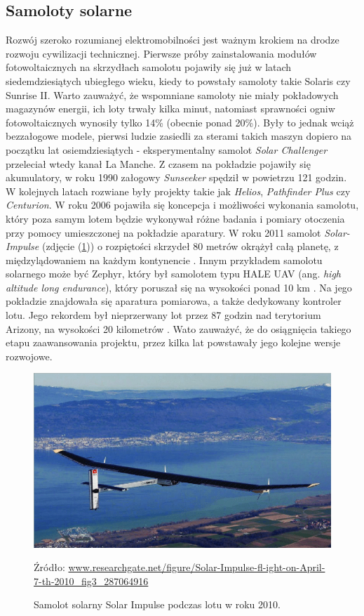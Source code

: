 \documentclass[12pt, a4paper]{article}
\let\oldref\ref
\renewcommand{\ref}[1]{(\oldref{#1})}
\begin{document}
\subsection{Samoloty solarne}
Rozwój szeroko rozumianej elektromobilności jest ważnym krokiem na drodze rozwoju cywilizacji technicznej. Pierwsze próby zainstalowania modułów fotowoltaicznych na skrzydłach samolotu pojawiły się już w latach siedemdziesiątych ubiegłego wieku, kiedy to powstały samoloty takie Solaris czy Sunrise II. Warto zauważyć, że wspomniane samoloty nie miały pokładowych magazynów energii, ich loty trwały kilka minut, natomiast sprawności ogniw fotowoltaicznych wynosiły tylko 14\% (obecnie ponad 20\%). Były to jednak wciąż bezzałogowe modele, pierwsi ludzie zasiedli za sterami takich maszyn dopiero na początku lat osiemdziesiątych - eksperymentalny samolot \textit{Solar Challenger} przeleciał wtedy kanał La Manche. Z czasem na pokładzie pojawiły się akumulatory, w roku 1990 załogowy \textit{Sunseeker} spędził w powietrzu 121 godzin. W kolejnych latach rozwiane były projekty takie jak \textit{Helios}, \textit{Pathfinder Plus} czy \textit{Centurion}. W roku 2006 pojawiła się koncepcja i możliwości wykonania samolotu, który poza samym lotem będzie wykonywał różne badania i pomiary otoczenia przy pomocy umieszczonej na pokładzie aparatury. W roku 2011 samolot \textit{Solar-Impulse} (zdjęcie \ref{fig:solimp}) o rozpiętości skrzydeł 80 metrów okrążył całą planetę, z międzylądowaniem na każdym kontynencie \cite{Design of Solar Powered Airplane}. Innym przykładem samolotu solarnego może być Zephyr, który był samolotem typu HALE UAV (ang. \textit{high altitude long endurance}), który poruszał się na wysokości ponad 10 km . Na jego pokładzie znajdowała się aparatura pomiarowa, a także dedykowany kontroler lotu. Jego rekordem był nieprzerwany lot przez 87 godzin nad terytorium Arizony, na wysokości 20 kilometrów \cite{zephyr}. Wato zauważyć, że do osiągnięcia takiego etapu zaawansowania projektu, przez kilka lat powstawały jego kolejne wersje rozwojowe.

\begin{figure}[ht]
    \centering
    \includegraphics[width=1\textwidth]{solarimpulse}
    \caption{Samolot solarny Solar Impulse podczas lotu w roku 2010.}
    \small Źródło: \url{www.researchgate.net/figure/Solar-Impulse-fl-ight-on-April-7-th-2010_fig3_287064916}
    \label{fig:solimp}
\end{figure}
\end{document}
